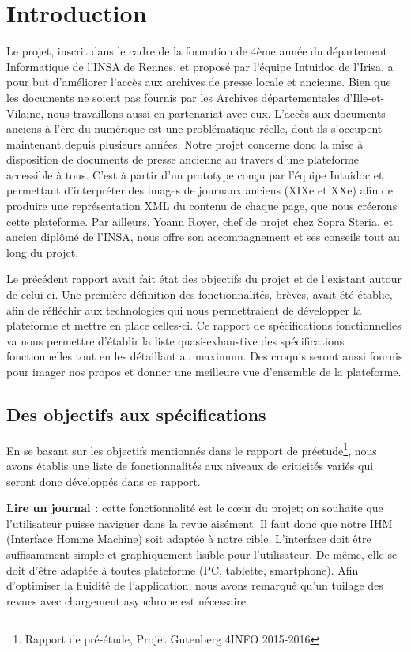 \section{Introduction}
\label{sec:intro}

Le projet, inscrit dans le cadre de la formation de 4ème année du département Informatique de l’INSA de Rennes, et proposé par l’équipe
Intuidoc de l’Irisa, a pour but d’améliorer l’accès aux archives de presse locale et ancienne. Bien que les documents ne soient pas fournis par les Archives départementales d'Ille-et-Vilaine, nous travaillons aussi en partenariat avec eux. L'accès aux documents anciens à l'ère du numérique est une problématique réelle, dont ils s'occupent maintenant depuis plusieurs années. Notre projet concerne donc la mise à disposition de documents de presse ancienne au travers d'une plateforme accessible à tous. C'est à partir d'un prototype conçu par l'équipe Intuidoc et permettant d'interpréter des images de journaux anciens (XIXe et XXe) afin de produire une représentation XML du contenu de chaque page, que nous créerons cette plateforme. Par ailleurs, Yoann Royer, chef de projet chez Sopra Steria, et ancien diplômé de l'INSA, nous offre son accompagnement et ses conseils tout au long du projet.

Le précédent rapport avait fait état des objectifs du projet et de l'existant autour de celui-ci. Une première définition des fonctionnalités, brèves, avait été établie, afin de réfléchir aux technologies qui nous permettraient de développer la plateforme et mettre en place celles-ci. Ce rapport de spécifications fonctionnelles va nous permettre d'établir la liste quasi-exhaustive des spécifications fonctionnelles tout en les détaillant au maximum. Des croquis seront aussi fournis pour imager nos propos et donner une meilleure vue d'ensemble de la plateforme.

    \subsection{Des objectifs aux spécifications}
    \label{sec:objectifs}
    En se basant sur les objectifs mentionnés dans le rapport de préetude\footnote{Rapport de pré-étude, Projet Gutenberg 4INFO 2015-2016}, nous avons établis une liste de fonctionnalités aux niveaux de criticités variés qui seront donc développés dans ce rapport.


    \textbf{Lire un journal :} cette fonctionnalité est le cœur du projet; on souhaite que l'utilisateur puisse naviguer dans la revue aisément.
    Il faut donc que notre IHM (Interface Homme Machine) soit adaptée à notre cible. L’interface doit être suffisamment simple et graphiquement lisible pour l'utilisateur. De même, elle se doit d’être adaptée à toutes plateforme (PC, tablette, smartphone). Afin d’optimiser la fluidité de l’application, nous avons remarqué
    qu’un tuilage des revues avec chargement asynchrone est nécessaire.


